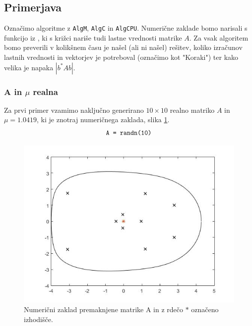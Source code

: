 \documentclass[12pt,a4paper]{amsart}
\theoremstyle{definition}
\theoremstyle{plain}
\begin{document}
\subsection{Primerjava}
O\-zna\-či\-mo algoritme z \verb+AlgM+, \verb+AlgC+ in \verb+AlgCPU+. Numerične zaklade bomo narisali s funkcijo iz \cite{fovals}, ki s križci nariše tudi lastne vrednosti matrike $A$. 
Za vsak algoritem bomo preverili v kolikšnem času je našel (ali ni našel) rešitev, koliko izračunov lastnih vrednosti in vektorjev je potreboval (označimo kot "Koraki") %
%
%
ter kako velika je napaka $|b^\ast Ab|.$
\subsubsection{A in $\mu$ realna}

Za prvi primer vzamimo naključno generirano $10\times 10$ realno matriko $A$ in $\mu = 1.0419$, ki je znotraj numeričnega zaklada, slika \ref{fig:p1}.
$$\verb+A = randn(10)+$$

\begin{figure}[!h]
\centering
\includegraphics[scale=0.4]{RR1.jpg}
\caption{Numerični zaklad premaknjene matrike A in z rdečo $\ast$ označeno izhodišče.}
\label{fig:p1}
\end{figure}
\end{document}
